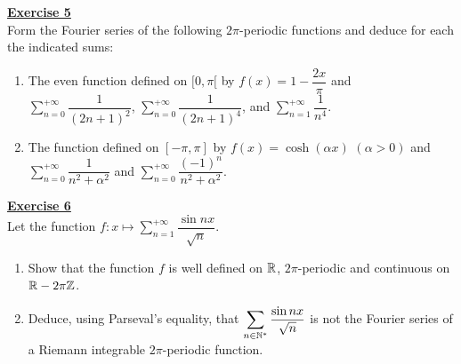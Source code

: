 \noindent\Large{\underline{\textbf{Exercise 5}}}
\normalsize{}\\
\noindent Form the Fourier series of the following $2\pi$-periodic functions and deduce for each the indicated sums:
\begin{enumerate}
    \item The even function defined on $[0, \pi[$ by $f(x) = 1 - \dfrac{2x}{\pi}$ and 
    $\displaystyle\sum_{n=0}^{+\infty} \dfrac{1}{(2n+1)^2}$, 
    $\displaystyle\sum_{n=0}^{+\infty} \dfrac{1}{(2n+1)^4}$, and 
    $\displaystyle\sum_{n=1}^{+\infty} \dfrac{1}{n^4}$.
    \item The function defined on $[-\pi, \pi]$ by $f(x) = \cosh(\alpha x)$ $(\alpha > 0)$ and 
    $\displaystyle\sum_{n=0}^{+\infty} \dfrac{1}{n^2 + \alpha^2}$ and 
    $\displaystyle\sum_{n=0}^{+\infty} \dfrac{(-1)^n}{n^2 + \alpha^2}$.\\
\end{enumerate}

\noindent\Large{\underline{\textbf{Exercise 6}}}
\normalsize{}\\
\noindent Let the function $f : x \longmapsto \displaystyle\sum_{n=1}^{+\infty} \dfrac{\sin nx}{\sqrt{n}}$.
\begin{enumerate}
    \item Show that the function $f$ is well defined on $\mathbb{R}$, $2\pi$-periodic and continuous on 
          $\mathbb{R} - 2\pi\mathbb{Z}$.
    \item Deduce, using Parseval's equality, that $\displaystyle\sum_{n \in \mathbb{N}^*} \dfrac{\sin nx}{\sqrt{n}}$ 
          is not the Fourier series of a Riemann integrable $2\pi$-periodic function.
\end{enumerate}

